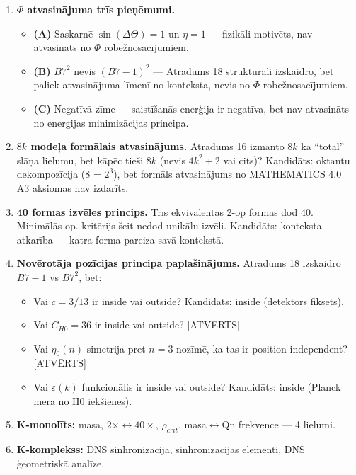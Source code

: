 \documentclass[12pt,a4paper]{article}
\begin{document}
\begin{enumerate}
    \item \textbf{$\Phi$ atvasinājuma trīs pieņēmumi.}
    \begin{itemize}
        \item \textbf{(A)} Saskarnē $\sin(\Delta\Theta)=1$ un $\eta=1$ — fizikāli motivēts, nav atvasināts no $\Phi$ robežnosacījumiem.
        \item \textbf{(B)} $B7^2$ nevis $(B7-1)^2$ — Atradums 18 strukturāli izskaidro, bet paliek atvasinājuma līmenī no konteksta, nevis no $\Phi$ robežnosacījumiem.
        \item \textbf{(C)} Negatīvā zīme — saistīšanās enerģija ir negatīva, bet nav atvasināts no energijas minimizācijas principa.
    \end{itemize}
    
    \item \textbf{$8k$ modeļa formālais atvasinājums.} Atradums 16 izmanto $8k$ kā ``total'' slāņa lielumu, bet kāpēc tieši $8k$ (nevis $4k^2+2$ vai cits)? Kandidāts: oktantu dekompozīcija (8 = $2^3$), bet formāls atvasinājums no MATHEMATICS 4.0 A3 aksiomas nav izdarīts.
    
    \item \textbf{40 formas izvēles princips.} Trīs ekvivalentas 2-op formas dod 40. Minimālās op. kritērijs šeit nedod unikālu izvēli. Kandidāts: konteksta atkarība — katra forma pareiza savā kontekstā.
    
    \item \textbf{Novērotāja pozīcijas principa paplašinājums.} Atradums 18 izskaidro $B7-1$ vs $B7^2$, bet:
    \begin{itemize}
        \item Vai $c = 3/13$ ir inside vai outside? Kandidāts: inside (detektors fiksēts).
        \item Vai $C_{H0} = 36$ ir inside vai outside? [ATVĒRTS]
        \item Vai $\eta_0(n)$ simetrija pret $n=3$ nozīmē, ka tas ir position-independent? [ATVĒRTS]
        \item Vai $\varepsilon(k)$ funkcionālis ir inside vai outside? Kandidāts: inside (Planck mēra no H0 iekšienes).
    \end{itemize}
    
    \item \textbf{K-monolīts:} masa, $2\times\leftrightarrow 40\times$, $\rho_{crit}$, masa$\leftrightarrow$Qn frekvence — 4 lielumi.
    
    \item \textbf{K-komplekss:} DNS sinhronizācija, sinhronizācijas elementi, DNS ģeometriskā analīze.
\end{enumerate}
\end{document}
